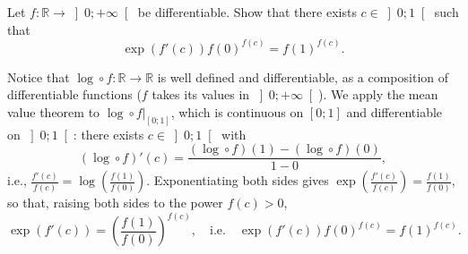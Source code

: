 \begin{problem}
    Let \( f \colon \mathbb{R} \longrightarrow \left]0;+\infty\right[ \) be differentiable. Show that there exists \( c \in \left]0;1\right[ \) such that
    \[
        \exp\left(f'\left(c\right)\right) f\left(0\right)^{f\left(c\right)} = f\left(1\right)^{f\left(c\right)}.
    \]
\end{problem}
\begin{solution}
    Notice that \( \log \circ f \colon \mathbb{R} \longrightarrow \mathbb{R} \) is well defined and differentiable, as a composition of differentiable functions (\( f \) takes its values in \( \left]0;+\infty\right[ \)). We apply the mean value theorem to \( \log \circ f|_{\left[0;1\right]} \), which is continuous on \( \left[0;1\right] \) and differentiable on \( \left]0;1\right[ \): there exists \( c \in \left]0;1\right[ \) with
    \[
        \left(\log \circ f\right)'\left(c\right) = \frac{\left(\log \circ f\right)\left(1\right)-\left(\log \circ f\right)\left(0\right)}{1-0},
    \]
    i.e., \( \frac{f'\left(c\right)}{f\left(c\right)} = \log\left(\frac{f\left(1\right)}{f\left(0\right)}\right) \). Exponentiating both sides gives \( \exp\left(\frac{f'\left(c\right)}{f\left(c\right)}\right) = \frac{f\left(1\right)}{f\left(0\right)} \), so that, raising both sides to the power \( f\left(c\right) > 0 \),
    \[
        \exp\left(f'\left(c\right)\right) = \left(\frac{f\left(1\right)}{f\left(0\right)}\right)^{f\left(c\right)}, \quad \text{i.e.} \quad \exp\left(f'\left(c\right)\right) f\left(0\right)^{f\left(c\right)} = f\left(1\right)^{f\left(c\right)}.
    \]
\end{solution}
